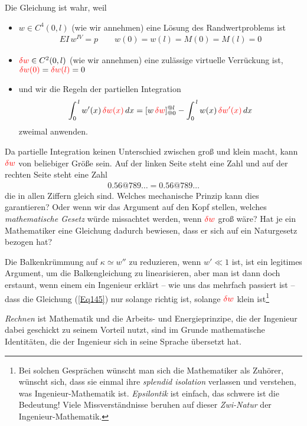 {{{{{Die Gleichung ist wahr, weil
\begin{itemize}
  \item $w \in C^4(0,l)$ (wie wir annehmen) eine L\"{o}sung des Randwertproblems ist
\begin{align}\label{Eq146}
EI\,w^{IV} = p \qquad w(0)= w(l) = M(0) = M(l) = 0
\end{align}
  \item  $\textcolor{red}{\delta w} \in C^2(0,l)$  (wie wir annehmen) eine zul\"{a}ssige virtuelle Verr\"{u}ckung ist,  $\textcolor{red}{\delta w(0)} = \textcolor{red}{\delta w(l)} = 0$
  \item und wir die Regeln der partiellen Integration
\begin{align}
\int_0^{\,l} w'(x)\,\textcolor{red}{\delta w(x)}\,dx = [w\,\textcolor{red}{\delta w}]_{@0}^{@l} - \int_0^{\,l} w(x)\,\textcolor{red}{\delta w'(x)}\,dx
\end{align}
zweimal anwenden.
\end{itemize}
Da partielle Integration keinen Unterschied zwischen \glq gro{\ss}\grq{} und \glq klein\grq{} macht, kann $\textcolor{red}{\delta w}$ von beliebiger Gr\"{o}{\ss}e sein. Auf der linken Seite steht eine Zahl und auf der rechten Seite steht eine Zahl
\begin{align}
0.56@789\ldots = 0.56@789\ldots
\end{align}
die in allen Ziffern gleich sind. Welches mechanische Prinzip kann dies garantieren? Oder wenn wir das Argument auf den Kopf stellen, welches {\em mathematische Gesetz\/} w\"{u}rde missachtet werden, wenn $\textcolor{red}{\delta w}$ gro{\ss} w\"{a}re? Hat je ein Mathematiker eine Gleichung dadurch bewiesen, dass er sich auf ein Naturgesetz bezogen hat?

Die Balkenkr\"{u}mmung auf $\kappa \simeq w''$ zu reduzieren, wenn $ w' \ll 1$ ist, ist ein legitimes Argument, um die Balkengleichung zu linearisieren, aber man ist dann doch erstaunt, wenn einem ein Ingenieur erkl\"{a}rt -- wie uns das mehrfach passiert ist -- dass die Gleichung (\ref{Eq145}) nur solange richtig ist, solange $\textcolor{red}{\delta w}$ klein ist\footnote{Bei solchen Gespr\"{a}chen w\"{u}nscht man sich die Mathematiker als Zuh\"{o}rer, w\"{u}nscht sich, dass sie einmal ihre {\em splendid isolation\/} verlassen und verstehen, was Ingenieur-Mathematik ist. {\em \glq Epsilontik\grq{}\/} ist einfach, das schwere ist die Bedeutung! Viele Missverst\"{a}ndnisse beruhen auf dieser {\em Zwi-Natur\/} der Ingenieur-Mathematik.}

{\em Rechnen\/} ist Mathematik und die Arbeits- und Energieprinzipe, die der Ingenieur dabei geschickt zu seinem Vorteil nutzt, sind im Grunde mathematische Identit\"{a}ten, die der Ingenieur sich in seine Sprache \"{u}bersetzt hat.

}}}}}
